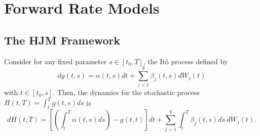 \newpage
\chapter{Forward Rate Models}
\section{The HJM Framework}
\setcounter{propos}{0}
\begin{propos}
Consider for any fixed parameter $s \in [t_0, T]$, the It\^o process
defined by
\begin{equation}
\label{eqdf}
dg(t,s) =  \alpha(t,s) dt + \sum_{j=1}^q \beta_j(t,s)dW_j (t) 
\end{equation}
with $ t \in [t_0,s]$. Then, the dynamics for the stochastic process
$H(t,T)=\int_t^T g(t,s) ds$ is
\begin{equation}
\label{eqdZ}
dH(t,T)=\left[\left(\int_t^T \alpha(t,s) ds\right) - g(t,t) \right] dt
+ \sum_{j=1}^q \int_t^T \beta_j(t,s) ds~dW_j (t).
\end{equation}
\end{propos} 
